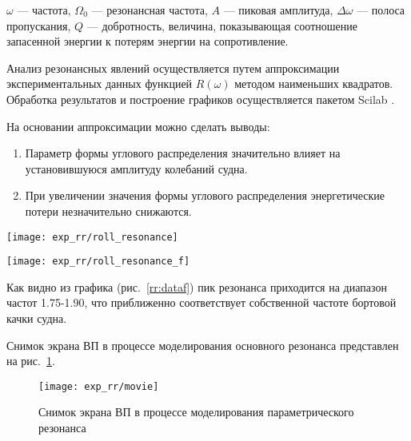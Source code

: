 $\omega$ --- частота, $\Omega_0$ --- резонансная частота, $A$ --- пиковая амплитуда, $\Delta \omega$ --- полоса пропускания, $Q$ --- добротность, величина, показывающая соотношение запасенной энергии к потерям энергии на сопротивление.

Анализ резонансных явлений осуществляется путем аппроксимации экспериментальных данных функцией $R(\omega)$ методом наименьших квадратов. Обработка результатов и построение графиков осуществляется пакетом Scilab \citep{scilab}.


На основании аппроксимации можно сделать выводы:
\begin{enumerate}
	\item	Параметр формы углового распределения значительно влияет на установившуюся амплитуду колебаний судна.
	\item 	При увеличении значения формы углового распределения энергетические потери незначительно снижаются.
\end{enumerate}

\begin{sidewaysfigure}
	\texttt{[image: exp\_rr/roll\_resonance]}
	\caption{Экспериментальные данные соотношения 10~\%-ной обеспеченность модуля угла бортовой качки к энергии волнения}
	\label{rr:data}
\end{sidewaysfigure}

\begin{sidewaysfigure}
	\texttt{[image: exp\_rr/roll\_resonance\_f]}
	\caption{Аппроксимация данных соотношения 10~\%-ной обеспеченности модуля угла бортовой качки к энергии волнения и параметры функции отклика}
	\label{rr:dataf}
\end{sidewaysfigure}


Как видно из графика (рис.~\ref{rr:dataf}) пик резонанса приходится на диапазон частот 1.75-1.90, что приближенно соответствует собственной частоте бортовой качки судна.

Снимок экрана ВП в процессе моделирования основного резонанса представлен на рис.~\ref{exp:rr_movie}.

\begin{figure}
	\begin{center}
	\texttt{[image: exp\_rr/movie]}
	\end{center}
	\caption{Снимок экрана ВП в процессе моделирования параметрического резонанса}
	\label{exp:rr_movie}
\end{figure}




